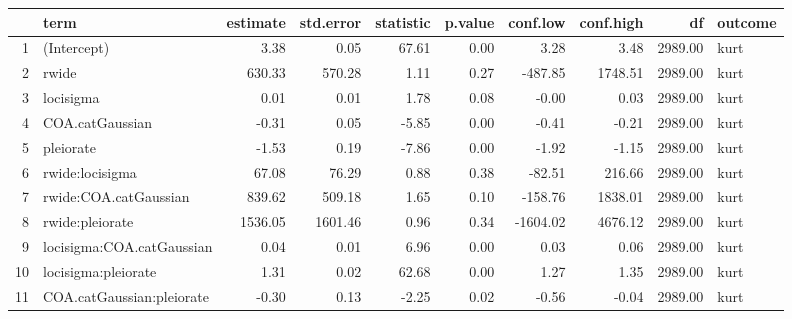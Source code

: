 \begin{table}[ht]
\centering
\begin{tabular}{rlrrrrrrrl}
  \hline
 & term & estimate & std.error & statistic & p.value & conf.low & conf.high & df & outcome \\ 
  \hline
1 & (Intercept) & 3.38 & 0.05 & 67.61 & 0.00 & 3.28 & 3.48 & 2989.00 & kurt \\ 
  2 & rwide & 630.33 & 570.28 & 1.11 & 0.27 & -487.85 & 1748.51 & 2989.00 & kurt \\ 
  3 & locisigma & 0.01 & 0.01 & 1.78 & 0.08 & -0.00 & 0.03 & 2989.00 & kurt \\ 
  4 & COA.catGaussian & -0.31 & 0.05 & -5.85 & 0.00 & -0.41 & -0.21 & 2989.00 & kurt \\ 
  5 & pleiorate & -1.53 & 0.19 & -7.86 & 0.00 & -1.92 & -1.15 & 2989.00 & kurt \\ 
  6 & rwide:locisigma & 67.08 & 76.29 & 0.88 & 0.38 & -82.51 & 216.66 & 2989.00 & kurt \\ 
  7 & rwide:COA.catGaussian & 839.62 & 509.18 & 1.65 & 0.10 & -158.76 & 1838.01 & 2989.00 & kurt \\ 
  8 & rwide:pleiorate & 1536.05 & 1601.46 & 0.96 & 0.34 & -1604.02 & 4676.12 & 2989.00 & kurt \\ 
  9 & locisigma:COA.catGaussian & 0.04 & 0.01 & 6.96 & 0.00 & 0.03 & 0.06 & 2989.00 & kurt \\ 
  10 & locisigma:pleiorate & 1.31 & 0.02 & 62.68 & 0.00 & 1.27 & 1.35 & 2989.00 & kurt \\ 
  11 & COA.catGaussian:pleiorate & -0.30 & 0.13 & -2.25 & 0.02 & -0.56 & -0.04 & 2989.00 & kurt \\ 
   \hline
\end{tabular}
\end{table}
